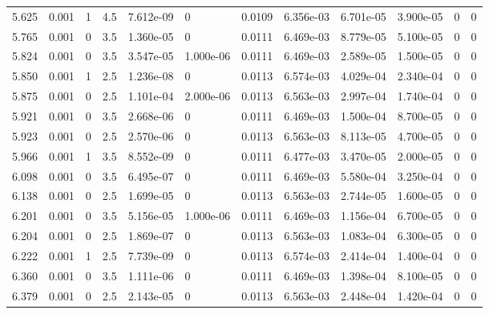 \documentclass[preview]{standalone}
\begin{document}
{{{\begin{tabular}{L{1.2cm}C{1.2cm} C{0.3cm}C{0.5cm} C{1.4cm}C{1.4cm} C{1.4cm}C{1.4cm} C{1.6cm}C{1.6cm} C{1.6cm}C{1.6cm}}
  5.625  &  0.001  & 1     & 4.5 &  7.612e-09  & 0  &  0.0109&   6.356e-03& 6.701e-05 & 3.900e-05   &  0 & 0  \\ 
  5.765  &  0.001  & 0     & 3.5 &  1.360e-05  & 0  &  0.0111&   6.469e-03& 8.779e-05 & 5.100e-05   &  0 & 0  \\ 
  5.824  &  0.001  & 0     & 3.5 &  3.547e-05  & 1.000e-06  &  0.0111&   6.469e-03& 2.589e-05 & 1.500e-05   &  0 & 0  \\ 
  5.850  &  0.001  & 1     & 2.5 &  1.236e-08  & 0  &  0.0113&   6.574e-03& 4.029e-04 & 2.340e-04   &  0 & 0  \\ 
  5.875  &  0.001  & 0     & 2.5 &  1.101e-04  & 2.000e-06  &  0.0113&   6.563e-03& 2.997e-04 & 1.740e-04   &  0 & 0  \\ 
  5.921  &  0.001  & 0     & 3.5 &  2.668e-06  & 0  &  0.0111&   6.469e-03& 1.500e-04 & 8.700e-05   &  0 & 0  \\ 
  5.923  &  0.001  & 0     & 2.5 &  2.570e-06  & 0  &  0.0113&   6.563e-03& 8.113e-05 & 4.700e-05   &  0 & 0  \\ 
  5.966  &  0.001  & 1     & 3.5 &  8.552e-09  & 0  &  0.0111&   6.477e-03& 3.470e-05 & 2.000e-05   &  0 & 0  \\ 
  6.098  &  0.001  & 0     & 3.5 &  6.495e-07  & 0  &  0.0111&   6.469e-03& 5.580e-04 & 3.250e-04   &  0 & 0  \\ 
  6.138  &  0.001  & 0     & 2.5 &  1.699e-05  & 0  &  0.0113&   6.563e-03& 2.744e-05 & 1.600e-05   &  0 & 0  \\ 
  6.201  &  0.001  & 0     & 3.5 &  5.156e-05  & 1.000e-06  &  0.0111&   6.469e-03& 1.156e-04 & 6.700e-05   &  0 & 0  \\ 
  6.204  &  0.001  & 0     & 2.5 &  1.869e-07  & 0  &  0.0113&   6.563e-03& 1.083e-04 & 6.300e-05   &  0 & 0  \\ 
  6.222  &  0.001  & 1     & 2.5 &  7.739e-09  & 0  &  0.0113&   6.574e-03& 2.414e-04 & 1.400e-04   &  0 & 0  \\ 
  6.360  &  0.001  & 0     & 3.5 &  1.111e-06  & 0  &  0.0111&   6.469e-03& 1.398e-04 & 8.100e-05   &  0 & 0  \\ 
  6.379  &  0.001  & 0     & 2.5 &  2.143e-05  & 0  &  0.0113&   6.563e-03& 2.448e-04 & 1.420e-04   &  0 & 0  \\ 
\hline 
\end{tabular} 

}}}
\end{document}

